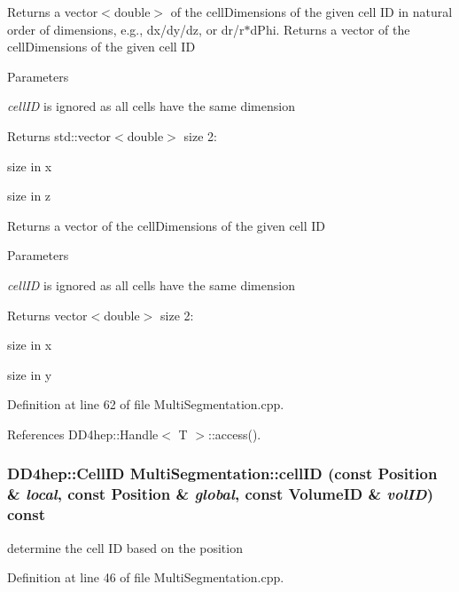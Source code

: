 Returns a vector$<$double$>$ of the cellDimensions of the given cell ID in natural order of dimensions, e.g., dx/dy/dz, or dr/r$\ast$dPhi. Returns a vector of the cellDimensions of the given cell ID 
\begin{DoxyParams}{Parameters}
\item[{\em cellID}]is ignored as all cells have the same dimension \end{DoxyParams}
\begin{DoxyReturn}{Returns}
std::vector$<$double$>$ size 2:
\begin{DoxyEnumerate}
\item size in x
\item size in z
\end{DoxyEnumerate}
\end{DoxyReturn}
Returns a vector of the cellDimensions of the given cell ID 
\begin{DoxyParams}{Parameters}
\item[{\em cellID}]is ignored as all cells have the same dimension \end{DoxyParams}
\begin{DoxyReturn}{Returns}
vector$<$double$>$ size 2:
\begin{DoxyEnumerate}
\item size in x
\item size in y 
\end{DoxyEnumerate}
\end{DoxyReturn}


Definition at line 62 of file MultiSegmentation.cpp.

References DD4hep::Handle$<$ T $>$::access().\hypertarget{class_d_d4hep_1_1_geometry_1_1_multi_segmentation_ab30df6aaf2cf4128c21679a9afd0087e}{
\subsubsection[{cellID}]{\setlength{\rightskip}{0pt plus 5cm}DD4hep::CellID MultiSegmentation::cellID (const {\bf Position} \& {\em local}, \/  const {\bf Position} \& {\em global}, \/  const VolumeID \& {\em volID}) const}}
\label{class_d_d4hep_1_1_geometry_1_1_multi_segmentation_ab30df6aaf2cf4128c21679a9afd0087e}


determine the cell ID based on the position 

Definition at line 46 of file MultiSegmentation.cpp.

